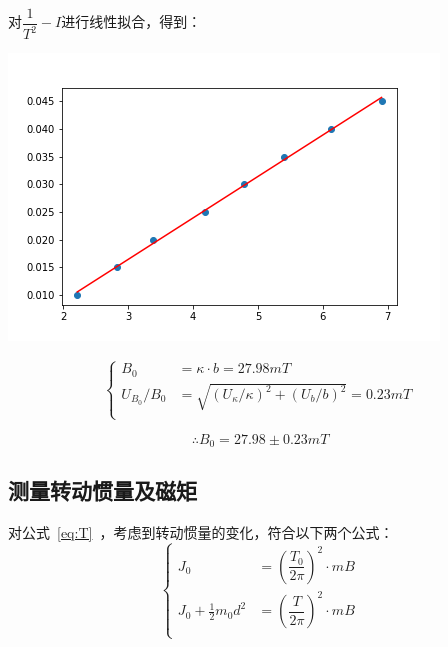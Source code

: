 \documentclass[a4paper]{ltxdoc}
\newenvironment{Figure}
{\par\medskip\noindent\minipage{\linewidth}}
{\endminipage\par\medskip}
\begin{document}
\begin{multicols}{2}
    对$\dfrac{1}{T^2} - I$进行线性拟合，得到：

    \begin{Figure}
        \centering
        \includegraphics[scale=0.5]{img/data_2.png}
    \end{Figure}

    \begin{equation}
        \left\{
        \begin{aligned}
            B_0           & = \kappa \cdot b = 27.98 mT                            \\
            U_{B_0} / B_0 & = \sqrt{(U_\kappa / \kappa)^2 + (U_b / b)^2} = 0.23 mT \\
        \end{aligned}
        \right.
    \end{equation}

    \begin{equation}
        \therefore B_0 = 27.98 \pm 0.23 mT
    \end{equation}

    \subsection{测量转动惯量及磁矩}

    对公式~\ref{eq:T}~，考虑到转动惯量的变化，符合以下两个公式：
    \begin{equation}
        \left\{
        \begin{aligned}
            J_0                     & = (\dfrac{T_0}{2\pi})^2 \cdot mB \\
            J_0 + \frac 1 2 m_0 d^2 & = (\dfrac{T}{2\pi})^2 \cdot mB   \\
        \end{aligned}
        \right.
    \end{equation}


\end{multicols}
\end{document}
